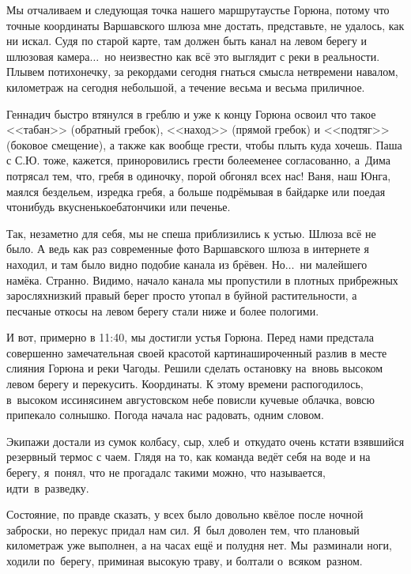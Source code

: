 Мы отчаливаем и следующая точка нашего маршрута\mdash устье Горюна, потому что точные координаты Варшавского шлюза мне достать, представьте, не удалось, как ни искал. Судя по старой карте, там должен быть канал на левом берегу и шлюзовая камера$\ldots$~но неизвестно как всё это выглядит с реки в реальности. Плывем потихонечку, за рекордами сегодня гнаться смысла нет\mdash времени навалом, километраж на сегодня небольшой, а течение весьма и весьма приличное. 

Геннадич быстро втянулся в греблю и уже к концу Горюна освоил что такое <<табан>> (обратный гребок), <<наход>> (прямой гребок) и <<подтяг>> (боковое смещение), а также как вообще грести, чтобы плыть куда хочешь. Паша с С.Ю. тоже, кажется, приноровились грести более\sdash менее согласованно, а~Дима потрясал тем, что, гребя в одиночку, порой обгонял всех нас! Ваня, наш Юнга, маялся бездельем, изредка гребя, а больше подрёмывая в байдарке или поедая что\sdash нибудь вкусненькое\mdash батончики или печенье. 

\newpage
Так, незаметно для себя, мы не спеша приблизились к устью. Шлюза всё не было. А ведь как раз современные фото Варшавского шлюза в интернете я находил, и там было видно подобие канала из брёвен. Но$\ldots$~ни малейшего намёка. Странно. Видимо, начало канала мы пропустили в плотных прибрежных зарослях\mdash низкий правый берег просто утопал в буйной растительности, а песчаные откосы на левом берегу стали ниже и более пологими. 

И вот, примерно в 11:40, мы достигли устья Горюна. Перед нами предстала совершенно замечательная своей красотой картина\mdash широченный разлив в месте слияния Горюна и реки Чагоды. Решили сделать остановку на~вновь высоком левом берегу и перекусить. Координаты\mdash \CoordsGorunSixteenUstie. К этому времени распогодилось, в~высоком иссиня\sdash синем августовском небе повисли кучевые облачка, вовсю припекало солнышко. Погода начала нас радовать, одним словом. 

Экипажи достали из сумок колбасу, сыр, хлеб и~откуда\sdash то очень кстати взявшийся резервный термос с чаем. Глядя на то, как команда ведёт себя на воде и на берегу, я~понял, что не прогадал\mdash с такими можно, что называется, идти~в~разведку. 

Состояние, по правде сказать, у всех было довольно квёлое после ночной заброски, но перекус придал нам сил. Я~был доволен тем, что плановый километраж уже выполнен, а на часах ещё и полудня нет. Мы~разминали ноги, ходили по~берегу, приминая высокую траву, и болтали о~всяком~разном.

